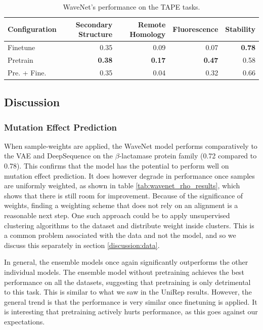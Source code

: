 \begin{table}[H]
    \centering
    \begin{tabularx}{0.93\textwidth}{lrrrr}
    \hline
    \textbf{Configuration} & \textbf{Secondary Structure} & \textbf{Remote Homology} & \textbf{Fluorescence} & \textbf{Stability} \\ \hline
    Finetune               & 0.35                         & 0.09                     & 0.07                  & \textbf{0.78} \\
    Pretrain               & \textbf{0.38}                & \textbf{0.17}            & \textbf{0.47}         & 0.58 \\
    Pre. + Fine.           & 0.35                         & 0.04                     & 0.32                  & 0.66 \\
    \hline
    \end{tabularx}
    \caption{WaveNet's performance on the TAPE tasks.}
    \label{tab:wavenet_tape_results}
\end{table}

\subsection{Discussion}
\label{sec:wavenet_discussion}

\subsubsection{Mutation Effect Prediction}
When sample-weights are applied, the WaveNet model performs comparatively to the VAE and DeepSequence on the $\beta$-lactamase protein family (0.72 compared to 0.78). This confirms that the model has the potential to perform well on mutation effect prediction. It does however degrade in performance once samples are uniformly weighted, as shown in table \ref{tab:wavenet_rho_results}, which shows that there is still room for improvement. Because of the significance of weights, finding a weighting scheme that does not rely on an alignment is a reasonable next step. One such approach could be to apply unsupervised clustering algorithms to the dataset and distribute weight inside clusters. This is a common problem associated with the data and not the model, and so we discuss this separately in section \ref{discussion:data}.

In general, the ensemble models once again significantly outperforms the other individual models. The ensemble model without pretraining achieves the best performance on all the datasets, suggesting that pretraining is only detrimental to this task. This is similar to what we saw in the UniRep results. However, the general trend is that the performance is very similar once finetuning is applied. It is interesting that pretraining actively hurts performance, as this goes against our expectations.

